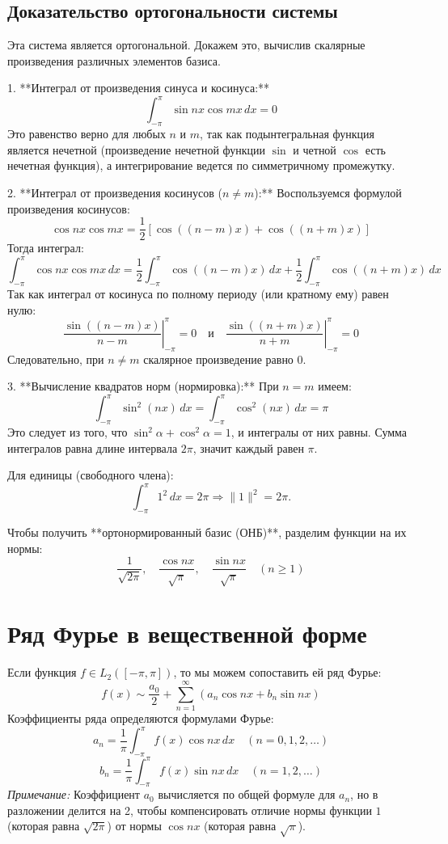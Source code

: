\documentclass[12pt,a4paper,openany]{book}
\begin{document}
\subsection{Доказательство ортогональности системы}

Эта система является ортогональной. Докажем это, вычислив скалярные произведения различных элементов базиса.

1.  **Интеграл от произведения синуса и косинуса:**
    $$
    \int_{-\pi}^{\pi} \sin nx \cos mx \, dx = 0
    $$
    Это равенство верно для любых $n$ и $m$, так как подынтегральная функция является нечетной (произведение нечетной функции $\sin$ и четной $\cos$ есть нечетная функция), а интегрирование ведется по симметричному промежутку.

2.  **Интеграл от произведения косинусов ($n \neq m$):**
    Воспользуемся формулой произведения косинусов:
    $$
    \cos nx \cos mx = \frac{1}{2} [\cos((n-m)x) + \cos((n+m)x)]
    $$
    Тогда интеграл:
    $$
    \int_{-\pi}^{\pi} \cos nx \cos mx \, dx = \frac{1}{2} \int_{-\pi}^{\pi} \cos((n-m)x) \, dx + \frac{1}{2} \int_{-\pi}^{\pi} \cos((n+m)x) \, dx
    $$
    Так как интеграл от косинуса по полному периоду (или кратному ему) равен нулю:
    $$
    \left. \frac{\sin((n-m)x)}{n-m} \right|_{-\pi}^{\pi} = 0 \quad \text{и} \quad \left. \frac{\sin((n+m)x)}{n+m} \right|_{-\pi}^{\pi} = 0
    $$
    Следовательно, при $n \neq m$ скалярное произведение равно 0.

3.  **Вычисление квадратов норм (нормировка):**
    При $n = m$ имеем:
    $$
    \int_{-\pi}^{\pi} \sin^2(nx) \, dx = \int_{-\pi}^{\pi} \cos^2(nx) \, dx = \pi
    $$
    Это следует из того, что $\sin^2 \alpha + \cos^2 \alpha = 1$, и интегралы от них равны. Сумма интегралов равна длине интервала $2\pi$, значит каждый равен $\pi$.
    
    Для единицы (свободного члена):
    $$
    \int_{-\pi}^{\pi} 1^2 \, dx = 2\pi \Rightarrow \|1\|^2 = 2\pi.
    $$

Чтобы получить **ортонормированный базис (ОНБ)**, разделим функции на их нормы:
$$
\frac{1}{\sqrt{2\pi}}, \quad \frac{\cos nx}{\sqrt{\pi}}, \quad \frac{\sin nx}{\sqrt{\pi}} \quad (n \ge 1)
$$

\section{Ряд Фурье в вещественной форме}

Если функция $f \in L_2([-\pi, \pi])$, то мы можем сопоставить ей ряд Фурье:
$$
f(x) \sim \frac{a_0}{2} + \sum_{n=1}^{\infty} (a_n \cos nx + b_n \sin nx)
$$
Коэффициенты ряда определяются формулами Фурье:
$$
a_n = \frac{1}{\pi} \int_{-\pi}^{\pi} f(x) \cos nx \, dx \quad (n=0, 1, 2, \dots)
$$
$$
b_n = \frac{1}{\pi} \int_{-\pi}^{\pi} f(x) \sin nx \, dx \quad (n=1, 2, \dots)
$$
\textit{Примечание:} Коэффициент $a_0$ вычисляется по общей формуле для $a_n$, но в разложении делится на 2, чтобы компенсировать отличие нормы функции $1$ (которая равна $\sqrt{2\pi}$) от нормы $\cos nx$ (которая равна $\sqrt{\pi}$).
\end{document}
